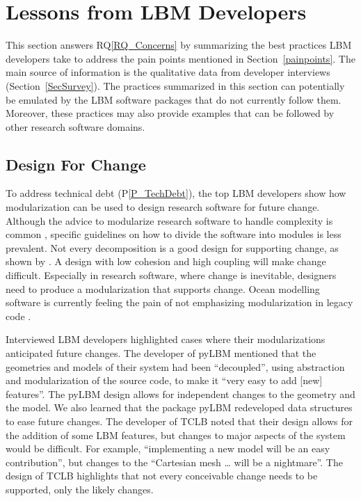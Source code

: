 \documentclass[final, 3p, times, authoryear]{elsarticle}
\newcommand{\rqref}[1]{RQ\ref{#1}}
\newcommand{\ppref}[1]{P\ref{#1}}
\begin{document}
\section{Lessons from LBM Developers} \label{Sec_AddressConcerns}

This section answers \rqref{RQ_Concerns} by summarizing the best practices LBM
developers take to address the pain points mentioned in
Section~\ref{painpoints}.  The main source of information is the qualitative
data from developer interviews (Section~\ref{SecSurvey}).  The practices
summarized in this section can potentially be emulated by the LBM software
packages that do not currently follow them.  Moreover, these practices may also
provide examples that can be followed by other research software domains.

\subsection{Design For Change} \label{Sec_DesForChange}

To address technical debt (\ppref{P_TechDebt}), the top LBM developers show how
modularization can be used to design research software for future change.
Although the advice to modularize research software to handle complexity is
common \citep{WilsonEtAl2014, StewartEtAl2017, Storer2017}, specific guidelines
on how to divide the software into modules is less prevalent.  Not every
decomposition is a good design for supporting change, as shown by
\citet{Parnas1972a}.  A design with low cohesion and high coupling \citep[p.\
48]{GhezziEtAl2003} will make change difficult. Especially in research software,
where change is inevitable, designers need to produce a modularization that
supports change. Ocean modelling software is currently feeling the pain of
not emphasizing modularization in legacy code \citep{JungEtAl2022}.

Interviewed LBM developers highlighted cases where their modularizations
anticipated future changes.  The developer of pyLBM mentioned that the
geometries and models of their system had been ``decoupled'', using abstraction
and modularization of the source code, to make it ``very easy to add [new]
features''.  The pyLBM design allows for independent changes to the geometry and
the model.  We also learned that the package pyLBM redeveloped data structures
to ease future changes. The developer of TCLB noted that their design allows for
the addition of some LBM features, but changes to major aspects of the system
would be difficult. For example, ``implementing a new model will be an easy
contribution'', but changes to the ``Cartesian mesh … will be a nightmare''.
The design of TCLB highlights that not every conceivable change needs to be
supported, only the likely changes.
\end{document}
